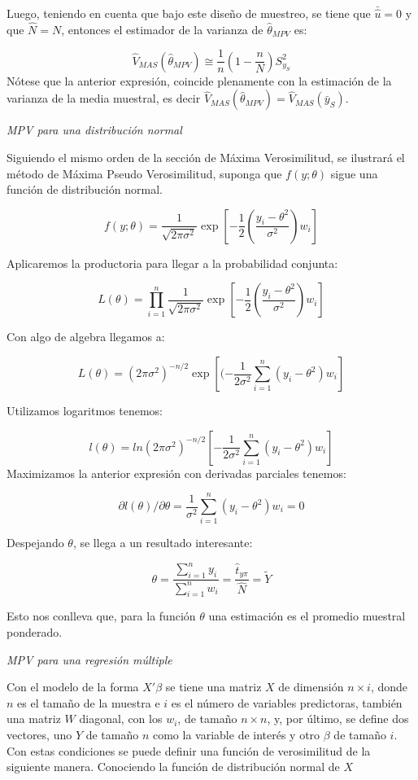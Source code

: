 \documentclass[
  spanish,
  12pt,
]{book}
\begin{document}
Luego, teniendo en cuenta que bajo este diseño de muestreo, se tiene que \(\bar{\hat{u}}=0\) y que \(\hat{N}=N\), entonces el estimador de la varianza de \(\hat{\theta}_{MPV}\) es:

\[
\hat{V}_{MAS}(\hat{\theta}_{MPV})\cong\frac{1}{n}\left(1-\frac{n}{N}\right)S_{y_{S}}^{2}
\]
Nótese que la anterior expresión, coincide plenamente con la estimación de la varianza de la media muestral, es decir \(\hat{V}_{MAS}(\hat{\theta}_{MPV})=\hat{V}_{MAS}(\bar{y}_{S})\).

\emph{MPV para una distribución normal}

Siguiendo el mismo orden de la sección de Máxima Verosimilitud, se ilustrará el método de Máxima Pseudo Verosimilitud, suponga que \(f(y;\theta)\) sigue una función de distribución normal.

\[
f(y;\theta)=\dfrac{1}{\sqrt{2\pi\sigma^{2}}}\exp\left[-\dfrac{1}{2}\left(\dfrac{y_{i}-\theta^{2}}{\sigma^{2}}\right)w_{i}\right]
\]

Aplicaremos la productoria para llegar a la probabilidad conjunta:

\[
L(\theta)=\prod_{i=1}^{n}\dfrac{1}{\sqrt{2\pi\sigma^{2}}}\exp\left[-\dfrac{1}{2}\left(\dfrac{y_{i}-\theta^{2}}{\sigma^{2}}\right)w_{i}\right]
\]

Con algo de algebra llegamos a:

\[
L(\theta)=(2\pi\sigma^{2})^{-n/2}\exp[(-\dfrac{1}{2\sigma^{2}}\sum_{i=1}^{n}(y_{i}-\theta^{2})w_{i}]
\]

Utilizamos logaritmos tenemos:

\[
l(\theta)=ln(2\pi\sigma^{2})^{-n/2}[-\dfrac{1}{2\sigma^{2}}\sum_{i=1}^{n}(y_{i}-\theta^{2})w_{i}]
\]
Maximizamos la anterior expresión con derivadas parciales tenemos:

\[
\partial l(\theta)/\partial\theta=\dfrac{1}{\sigma^{2}}\sum_{i=1}^{n}(y_{i}-\theta^{2})w_{i}=0
\]

Despejando \(\theta\), se llega a un resultado interesante:

\[
\theta=\dfrac{\sum_{i=1}^{n}y_{i}}{\sum_{i=1}^{n}w_{i}}=\dfrac{\hat{t}_{y\pi}}{\hat{N}}=\tilde{Y}
\]

Esto nos conlleva que, para la función \(\theta\) una estimación es el promedio muestral ponderado.

\emph{MPV para una regresión múltiple}

Con el modelo de la forma \(X'\beta\) se tiene una matriz \(X\) de dimensión \(n\times i\), donde \(n\) es el tamaño de la muestra e \(i\) es el número de variables predictoras, también una matriz \(W\) diagonal, con los \(w_{i}\), de tamaño \(n\times n\), y, por último, se define dos vectores, uno \(Y\) de tamaño \(n\) como la variable de interés y otro \(\beta\) de tamaño \(i\). Con estas condiciones se puede definir una función de verosimilitud de la siguiente manera. Conociendo la función de distribución normal de \(X\)
\end{document}
